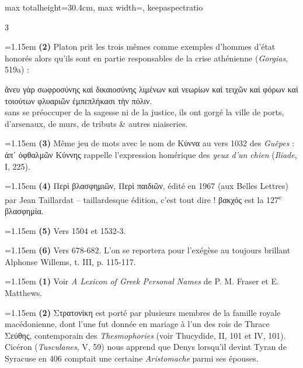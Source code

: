 \documentclass[11pt,twoside]{book}
\newcommand{\italique}[1]{\textit{#1}}
\newcommand{\citComm}[1]{\begin{quoting}[vskip=0.4pt,leftmargin=0.7em,rightmargin=0.2em]#1\end{quoting}}
\newcommand{\nieme}[1]{#1\textsuperscript{e}}
\newcommand{\latin}[1]{\textit{#1}}
\begin{document}
\begin{adjustbox}{max totalheight=30.4cm, max width=\textwidth, keepaspectratio}
\begin{minipage}{\textwidth}
{\begin{multicols}{3}
\par\vspace{1.5pt}
\noindent\hangindent=1.15em {\color{sepiaNote}\textbf{(2)}} Platon prit les trois mêmes comme exemples d'hommes d'état honorés alors qu'ils sont en partie responsables de la crise athénienne (\italique{Gorgias}, 519a) :
\citComm{ἄνευ γὰρ σωφροσύνης καὶ δικαιοσύνης λιμένων καὶ νεωρίων καὶ τειχῶν καὶ φόρων καὶ τοιούτων φλυαριῶν ἐμπεπλήκασι τὴν πόλιν.\\
sans se préoccuper de la sagesse ni de la justice, ils ont gorgé la ville de ports, d'arsenaux, de murs, de tributs \& autres niaiseries.}
\par\vspace{1.5pt}
\noindent\hangindent=1.15em {\color{sepiaNote}\textbf{(3)}} Même jeu de mots avec le nom de Κύννα au vers 1032 des \italique{Guêpes} : ἀπ᾽ ὀφθαλμῶν Κύννης rappelle l'expression homérique des \italique{yeux d'un chien} (\italique{Iliade}, I, 225).
\par\vspace{1.5pt}
\noindent\hangindent=1.15em {\color{sepiaNote}\textbf{(4)}} Περὶ βλασφημιῶν, Περὶ παιδιῶν, édité en 1967 (aux Belles Lettres) par Jean Taillardat -- taillardesque édition, c'est tout dire ! βακχός est la \nieme{127} βλασφημία.
\par\vspace{1.5pt}
\noindent\hangindent=1.15em {\color{sepiaNote}\textbf{(5)}} Vers 1504 et 1532-3.
\par\vspace{1.5pt}
\noindent\hangindent=1.15em {\color{sepiaNote}\textbf{(6)}} Vers 678-682. L'on se reportera pour l'exégèse au toujours brillant Alphonse Willems, t. III, p. 115-117.
\par\vspace{1.5pt}
\noindent\hangindent=1.15em {\color{sepiaNote}\textbf{(1)}} Voir \italique{A Lexicon of Greek Personal Names} de P. M. Fraser et E. Matthews.
\par\vspace{1.5pt}
\noindent\hangindent=1.15em {\color{sepiaNote}\textbf{(2)}} Στρατονίκη est porté par plusieurs membres de la famille royale macédonienne, dont l'une fut donnée en mariage à l'un des rois de Thrace Σεύθης, contemporain des \italique{Thesmophories} (voir Thucydide, II, 101 et IV, 101). Cicéron (\italique{Tusculanes}, V, 59) nous apprend que Denys lorsqu'il devint Tyran de Syracuse en 406 comptait une certaine \latin{Aristomache} parmi ses épouses.

\end{multicols}}
\end{minipage}
\end{adjustbox}
\end{document}
